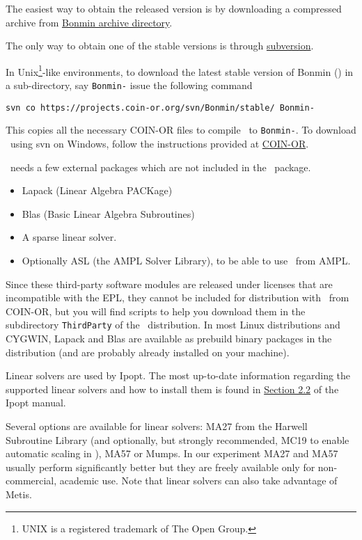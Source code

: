 The easiest way to obtain the released version is by downloading a compressed archive from \href{http://www.coin-or.org/Tarballs/Bonmin/}{Bonmin archive directory}.

The only way to obtain one of the stable versions is through \href{http://subversion.tigris.org/}{subversion}.

In Unix\footnote{UNIX is a registered trademark of The Open
Group.}-like environments, to download the latest stable version of Bonmin (\stableVersion) in a sub-directory, say {\tt Bonmin-\stableVersion} 
issue the following command
\begin{center}
\tt \small svn co
https://projects.coin-or.org/svn/Bonmin/stable/\stableVersion\ Bonmin-\stableVersion
\end{center}

\noindent This copies all the necessary COIN-OR files to compile \Bonmin\ to
{\tt Bonmin-\stableVersion}. To download \Bonmin\ using svn on Windows,
follow the instructions provided at
\href{http://www.coin-or.org/faqs.html\#q4}{COIN-OR}.

\Bonmin\ needs a few external packages which are not included in the \Bonmin\ package.
\begin{itemize}
\item Lapack (Linear Algebra PACKage)
\item Blas (Basic Linear Algebra Subroutines)
\item A sparse linear solver.
\item Optionally ASL (the AMPL Solver Library), to be able to use \Bonmin\ from AMPL.
\end{itemize}


Since these third-party software modules are released under licenses
that are incompatible with the EPL, they cannot be included for
distribution with \Bonmin\ from COIN-OR, but you will find scripts
to help you download them in the subdirectory {\tt ThirdParty} of
the \Bonmin\ distribution. In most Linux distributions and
CYGWIN, Lapack and Blas are available as prebuild binary packages in
the distribution (and are probably already installed on your
machine). 

Linear solvers are used by Ipopt. The most up-to-date information regarding the supported linear solvers and how to install them is found in \href{http://www.coin-or.org/Ipopt/documentation/node13.html}{Section 2.2} of the Ipopt manual.

Several options are available for linear solvers: MA27 from the Harwell Subroutine Library (and optionally, but strongly recommended, MC19 to enable automatic scaling in \Ipopt), MA57 or Mumps.
In our experiment MA27 and MA57 usually perform significantly better but they are freely 
available only for non-commercial, academic use. Note that linear solvers can also take advantage of Metis.
